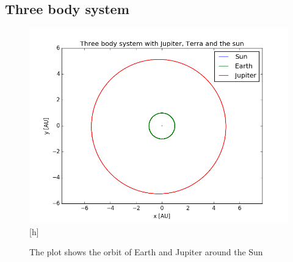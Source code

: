 \subsection{Three body system}
\begin{figure}[h]
\includegraphics[scale=0.7]{figures/three_body}[h]
\caption{The plot shows the orbit of Earth and Jupiter around the Sun }
\end{figure}


